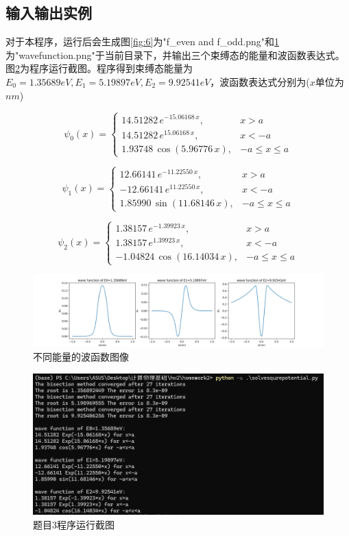 \documentclass[11pt]{article}
\begin{document}
  \subsection{输入输出实例}
  对于本程序，运行后会生成图\ref{fig:6}为"f\_even and f\_odd.png"和\ref{fig:7}为"wavefunction.png"于当前目录下，并输出三个束缚态的能量和波函数表达式。图\ref{fig:8}为程序运行截图。程序得到束缚态能量为$E_0=1.35689 eV,E_1=5.19897 eV,E_2=9.92541 eV$，波函数表达式分别为($x$单位为$nm$)
   

$$
\psi_0(x) = 
\begin{cases} 
14.51282 \, e^{-15.06168 \, x}, & x > a \\
14.51282 \, e^{15.06168 \, x}, & x < -a \\
1.93748 \, \cos(5.96776 \, x), & -a \leq x \leq a
\end{cases}
$$
  

  $$
  \psi_1(x) = 
  \begin{cases} 
  12.66141 \, e^{-11.22550 \, x}, & x > a \\
  -12.66141 \, e^{11.22550 \, x}, & x < -a \\
  1.85990 \, \sin(11.68146 \, x), & -a \leq x \leq a
  \end{cases}
  $$
  

  $$
  \psi_2(x) = 
  \begin{cases} 
    1.38157 \, e^{-1.39923 \, x}, & x > a \\
    1.38157 \, e^{1.39923 \, x}, & x < -a \\
  -1.04824 \, \cos(16.14034 \, x), & -a \leq x \leq a
  \end{cases}
  $$
  
  \begin{figure}[ht]
    \centering
    \includegraphics[width=1\linewidth]{photo/wavefunction.png}
    \caption{不同能量的波函数图像}
    \label{fig:7}
  \end{figure}
  \begin{figure}[ht]
    \centering
    \includegraphics[width=0.8\linewidth]{photo/fig8.png}
    \caption{题目3程序运行截图}
    \label{fig:8}
  \end{figure}
\end{document}
